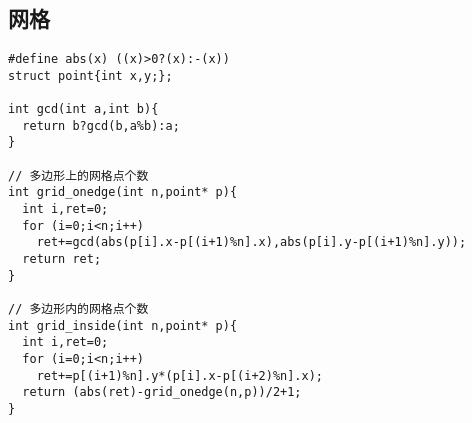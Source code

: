 \subsection{网格}
\begin{lstlisting}[language={}]
#define abs(x) ((x)>0?(x):-(x))
struct point{int x,y;};

int gcd(int a,int b){
  return b?gcd(b,a%b):a;
}

// 多边形上的网格点个数
int grid_onedge(int n,point* p){
  int i,ret=0;
  for (i=0;i<n;i++)
    ret+=gcd(abs(p[i].x-p[(i+1)%n].x),abs(p[i].y-p[(i+1)%n].y));
  return ret;
}

// 多边形内的网格点个数
int grid_inside(int n,point* p){
  int i,ret=0;
  for (i=0;i<n;i++)
    ret+=p[(i+1)%n].y*(p[i].x-p[(i+2)%n].x);
  return (abs(ret)-grid_onedge(n,p))/2+1;
}
\end{lstlisting}
